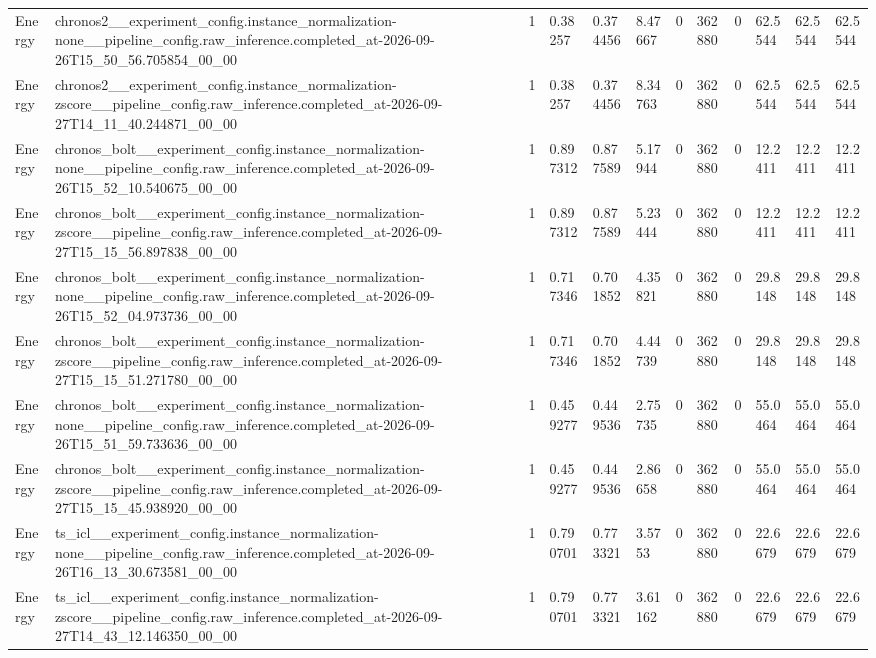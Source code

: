 \begin{tabular}{llllllllllll}
Energy & chronos2\_\_experiment\_config.instance\_normalization-none\_\_pipeline\_config.raw\_inference.completed\_at-2026-09-26T15\_50\_56.705854\_00\_00 & 1 & 0.38257 & 0.374456 & 8.47667 & 0 & 362880 & 0 & 62.5544 & 62.5544 & 62.5544 \\
Energy & chronos2\_\_experiment\_config.instance\_normalization-zscore\_\_pipeline\_config.raw\_inference.completed\_at-2026-09-27T14\_11\_40.244871\_00\_00 & 1 & 0.38257 & 0.374456 & 8.34763 & 0 & 362880 & 0 & 62.5544 & 62.5544 & 62.5544 \\
Energy & chronos\_bolt\_\_experiment\_config.instance\_normalization-none\_\_pipeline\_config.raw\_inference.completed\_at-2026-09-26T15\_52\_10.540675\_00\_00 & 1 & 0.897312 & 0.877589 & 5.17944 & 0 & 362880 & 0 & 12.2411 & 12.2411 & 12.2411 \\
Energy & chronos\_bolt\_\_experiment\_config.instance\_normalization-zscore\_\_pipeline\_config.raw\_inference.completed\_at-2026-09-27T15\_15\_56.897838\_00\_00 & 1 & 0.897312 & 0.877589 & 5.23444 & 0 & 362880 & 0 & 12.2411 & 12.2411 & 12.2411 \\
Energy & chronos\_bolt\_\_experiment\_config.instance\_normalization-none\_\_pipeline\_config.raw\_inference.completed\_at-2026-09-26T15\_52\_04.973736\_00\_00 & 1 & 0.717346 & 0.701852 & 4.35821 & 0 & 362880 & 0 & 29.8148 & 29.8148 & 29.8148 \\
Energy & chronos\_bolt\_\_experiment\_config.instance\_normalization-zscore\_\_pipeline\_config.raw\_inference.completed\_at-2026-09-27T15\_15\_51.271780\_00\_00 & 1 & 0.717346 & 0.701852 & 4.44739 & 0 & 362880 & 0 & 29.8148 & 29.8148 & 29.8148 \\
Energy & chronos\_bolt\_\_experiment\_config.instance\_normalization-none\_\_pipeline\_config.raw\_inference.completed\_at-2026-09-26T15\_51\_59.733636\_00\_00 & 1 & 0.459277 & 0.449536 & 2.75735 & 0 & 362880 & 0 & 55.0464 & 55.0464 & 55.0464 \\
Energy & chronos\_bolt\_\_experiment\_config.instance\_normalization-zscore\_\_pipeline\_config.raw\_inference.completed\_at-2026-09-27T15\_15\_45.938920\_00\_00 & 1 & 0.459277 & 0.449536 & 2.86658 & 0 & 362880 & 0 & 55.0464 & 55.0464 & 55.0464 \\
Energy & ts\_icl\_\_experiment\_config.instance\_normalization-none\_\_pipeline\_config.raw\_inference.completed\_at-2026-09-26T16\_13\_30.673581\_00\_00 & 1 & 0.790701 & 0.773321 & 3.5753 & 0 & 362880 & 0 & 22.6679 & 22.6679 & 22.6679 \\
Energy & ts\_icl\_\_experiment\_config.instance\_normalization-zscore\_\_pipeline\_config.raw\_inference.completed\_at-2026-09-27T14\_43\_12.146350\_00\_00 & 1 & 0.790701 & 0.773321 & 3.61162 & 0 & 362880 & 0 & 22.6679 & 22.6679 & 22.6679 \\

\end{tabular}

